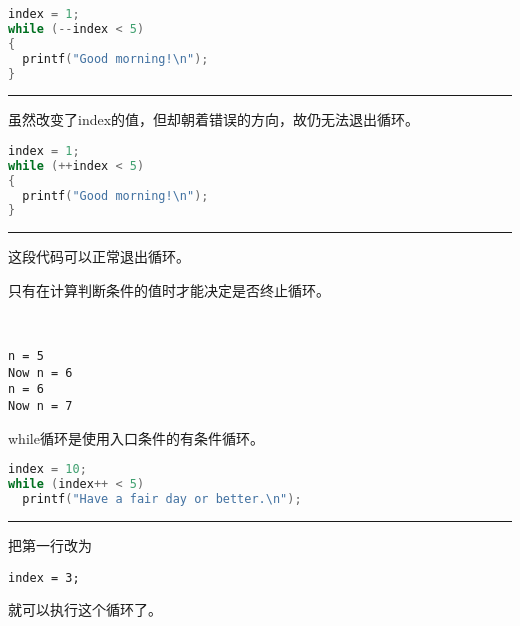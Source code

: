 \begin{frame}[fragile]
\begin{lstlisting}[language=c]
index = 1;
while (--index < 5)
{
  printf("Good morning!\n");
}
\end{lstlisting} 
\rule{\textwidth}{1mm}\pause \vspace{0.1in}

虽然改变了index的值，但却朝着错误的方向，故仍无法退出循环。
\end{frame}

\begin{frame}[fragile]
\begin{lstlisting}[language=c]
index = 1;
while (++index < 5)
{
  printf("Good morning!\n");
}
\end{lstlisting} 
\rule{\textwidth}{1mm}\pause \vspace{0.1in}

这段代码可以正常退出循环。
\end{frame}

\begin{frame}[fragile]
只有在计算判断条件的值时才能决定是否终止循环。
\end{frame}

\begin{frame}[fragile]
  \begin{minipage}{0.65\textwidth}
    
  \end{minipage}~~~~
  \begin{minipage}{0.3\textwidth}
\begin{lstlisting}[backgroundcolor=\color{red!10}]
n = 5
Now n = 6
n = 6
Now n = 7
\end{lstlisting}
    
  \end{minipage}


\end{frame}

\begin{frame}[fragile]
while循环是使用入口条件的有条件循环。
\end{frame}

\begin{frame}[fragile]
\begin{lstlisting}[language=c]
index = 10;
while (index++ < 5)
  printf("Have a fair day or better.\n");
\end{lstlisting}
\rule{\textwidth}{1mm}\pause 

把第一行改为
\begin{lstlisting}
index = 3;
\end{lstlisting}
就可以执行这个循环了。
\end{frame}

